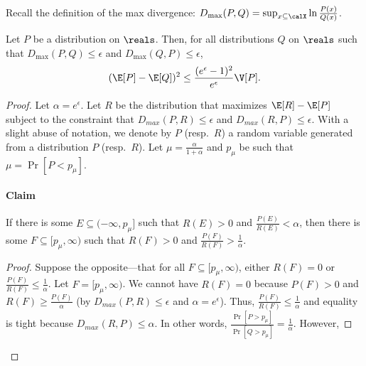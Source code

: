 Recall the definition of the max divergence: 
$D_{\max}(P,Q) = \sup_{x \subseteq \calX} \ln \frac{P(x)}{Q(x)}$.
\begin{lemma}\label{chap1-lem:dp-var-constr}
Let $P$ be a distribution on $\reals$. Then, for all distributions $Q$ on $\reals$ such that 
$D_{\max}(P,Q) \leq \epsilon$ and $D_{\max}(Q,P) \leq \epsilon$,
\[
(\E[P] - \E[Q])^2 \leq \frac{(e^\epsilon - 1)^2}{e^\epsilon}\V[P].
\]
\end{lemma}
\begin{proof}
Let $\alpha = e^\epsilon$. 
Let $R$ be the distribution that maximizes $\E[R] - \E[P]$ subject to the constraint that 
$D_{max}(P,R) \leq \epsilon$ and $D_{max}(R,P) \leq \epsilon$.
With a slight abuse of notation, we denote by $P$ (resp.~$R$) a random variable
generated from a distribution $P$ (resp.~$R$).
Let $\mu = \frac{\alpha}{1+\alpha}$ and $p_\mu$ be such that $\mu = \Pr[P<p_\mu]$.
\paragraph{Claim} If there is some $E \subseteq (-\infty, p_\mu]$ such that $R(E) > 0$ and $\frac{P(E)}{R(E)} < \alpha$, then there is some $F \subseteq [p_\mu, \infty)$ such that $R(F) > 0$ and $\frac{P(F)}{R(F)} > \frac{1}{\alpha}$.
\begin{proof}
Suppose the opposite---that for all $F \subseteq [p_\mu, \infty)$, either $R(F) = 0$ or $\frac{P(F)}{R(F)} \leq \frac{1}{\alpha}$. Let $F = [p_\mu, \infty)$. We cannot have $R(F) = 0$ because $P(F) > 0$ and 
$R(F) \geq \frac{P(F)}{\alpha}$ 
(by $D_{max}(P,R) \leq \epsilon$ and $\alpha=e^\epsilon$). Thus, $\frac{P(F)}{R(F)} \leq \frac{1}{\alpha}$ and equality is tight because $D_{max}(R,P) \leq \alpha$.
In other words, $\frac{\Pr[P > p_\mu]}{\Pr[Q > p_\mu]} = \frac{1}{\alpha}$. However,


\end{proof}
\end{proof}
